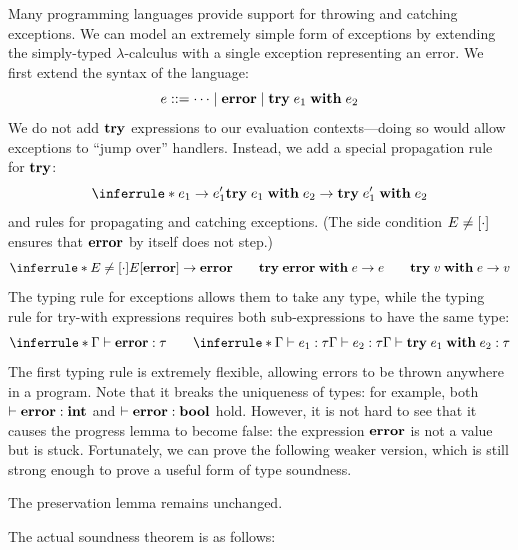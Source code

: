 Many programming languages provide support for throwing and catching exceptions. We can model an extremely simple form of exceptions by extending the simply-typed $\lambda$-calculus with a single exception representing an error. We first extend the syntax of the language:
\[
e ::= \cdots \mid \mathbf{error} \mid \mathbf{try}\; e_1\; \mathbf{with}\; e_2
\]
We do not add $\mathbf{try}$ expressions to our evaluation contexts---doing so would allow exceptions to ``jump over'' handlers. Instead, we add a special propagation rule for $\mathbf{try}$:
\[
\inferrule*{e_1 \to e_1'}{\kw{try}\; e_1\; \kw{with}\; e_2 \to \kw{try}\; e_1'\; \kw{with}\; e_2}
\]
and rules for propagating and catching exceptions. (The side condition $E \neq [\cdot]$ ensures that $\mathbf{error}$ by itself does not step.)
\[
\inferrule*{E \neq \hole}{E[\kw{error}] \to \kw{error}}
\qquad
\kw{try}\; \kw{error}\; \kw{with}\; e \to e
\qquad
\kw{try}\; v\; \kw{with}\; e \to v
\]
The typing rule for exceptions allows them to take any type, while the typing rule for try-with expressions requires both sub-expressions to have the same type:
\[
\inferrule*{ }{\Gamma \vdash \kw{error} : \tau}
\qquad
\inferrule*{\Gamma \vdash e_1 : \tau \\ \Gamma \vdash e_2 : \tau}{\Gamma \vdash \kw{try}\; e_1\; \kw{with}\; e_2 : \tau}
\]
The first typing rule is extremely flexible, allowing errors to be thrown anywhere in a program. Note that it breaks the uniqueness of types: for example, both $\vdash \mathbf{error} : \mathbf{int}$ and $\vdash \mathbf{error} : \mathbf{bool}$ hold. However, it is not hard to see that it causes the progress lemma to become false: the expression $\mathbf{error}$ is not a value but is stuck. Fortunately, we can prove the following weaker version, which is still strong enough to prove a useful form of type soundness.


The preservation lemma remains unchanged.

The actual soundness theorem is as follows:


% 
